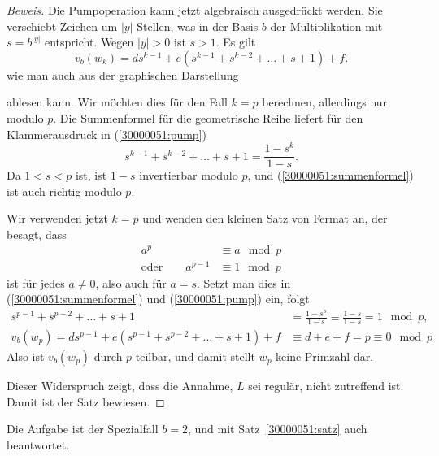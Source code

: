 \begin{loesung}
\begin{proof}[Beweis]
Die Pumpoperation kann jetzt algebraisch ausgedrückt werden.
Sie verschiebt Zeichen um $|y|$ Stellen, was in der Basis $b$ der
Multiplikation mit $s=b^{|y|}$ entspricht.
Wegen $|y|>0$ ist $s>1$.
Es gilt
\begin{equation}
v_b(w_k)
=
ds^{k-1} + e(s^{k-1}+s^{k-2}+\dots+s+1) + f.
\label{30000051:pump}
\end{equation}
wie man auch aus der graphischen Darstellung
\begin{center}
\end{center}
ablesen kann.
Wir möchten dies für den Fall $k=p$ berechnen, allerdings
nur modulo $p$.
Die Summenformel für die geometrische Reihe liefert
für den Klammerausdruck in (\ref{30000051:pump})
\begin{equation}
s^{k-1}+s^{k-2}+\dots+s+1 = \frac{1-s^k}{1-s}.
\label{30000051:summenformel}
\end{equation}
Da $1<s<p$ ist, ist $1-s$ invertierbar modulo $p$, und
(\ref{30000051:summenformel}) ist auch richtig modulo $p$. 

Wir verwenden jetzt $k=p$ und wenden den kleinen Satz von Fermat an,
der besagt, dass
\begin{align*}
a^p&\equiv a\mod p
\\
\text{oder}\qquad
a^{p-1}&\equiv 1\mod p
\end{align*}
ist für jedes $a\ne 0$, also auch für $a=s$.
Setzt man dies in (\ref{30000051:summenformel}) und (\ref{30000051:pump}) ein,
folgt
\begin{align*}
s^{p-1}+s^{p-2}+\dots+s+1
\phantom{)+f}
&=\frac{1-s^p}{1-s} \equiv \frac{1-s}{1-s}=1\mod p,
\\
v_b(w_p)
=
ds^{p-1} + e(s^{p-1}+s^{p-2}+\dots+s+1) + f
&\equiv
d+e+f = p\equiv 0 \mod p
\end{align*}
Also ist $v_b(w_p)$ durch $p$ teilbar, und damit stellt $w_p$ keine
Primzahl dar.

Dieser Widerspruch zeigt, dass die Annahme, $L$ sei regulär, nicht
zutreffend ist.
Damit ist der Satz bewiesen.
\renewcommand{\qedsymbol}{$\square$}
\end{proof}

Die Aufgabe ist der Spezialfall $b=2$, und mit Satz~\ref{30000051:satz}
auch beantwortet.
\end{loesung}
